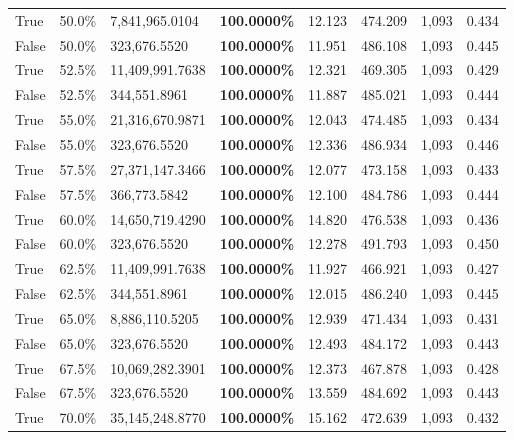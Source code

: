 \begin{table}[H]
\begin{tabular}{lllrllll}
\cline{1-8}
True & 50.0\% & 7,841,965.0104 & \bfseries \color{red} 100.0000\% & 12.123 & 474.209 & 1,093 & 0.434 \\
\cline{1-8}
False & 50.0\% & 323,676.5520 & \bfseries \color{red} 100.0000\% & 11.951 & 486.108 & 1,093 & 0.445 \\
\cline{1-8}
True & 52.5\% & 11,409,991.7638 & \bfseries \color{red} 100.0000\% & 12.321 & 469.305 & 1,093 & 0.429 \\
\cline{1-8}
False & 52.5\% & 344,551.8961 & \bfseries \color{red} 100.0000\% & 11.887 & 485.021 & 1,093 & 0.444 \\
\cline{1-8}
True & 55.0\% & 21,316,670.9871 & \bfseries \color{red} 100.0000\% & 12.043 & 474.485 & 1,093 & 0.434 \\
\cline{1-8}
False & 55.0\% & 323,676.5520 & \bfseries \color{red} 100.0000\% & 12.336 & 486.934 & 1,093 & 0.446 \\
\cline{1-8}
True & 57.5\% & 27,371,147.3466 & \bfseries \color{red} 100.0000\% & 12.077 & 473.158 & 1,093 & 0.433 \\
\cline{1-8}
False & 57.5\% & 366,773.5842 & \bfseries \color{red} 100.0000\% & 12.100 & 484.786 & 1,093 & 0.444 \\
\cline{1-8}
True & 60.0\% & 14,650,719.4290 & \bfseries \color{red} 100.0000\% & 14.820 & 476.538 & 1,093 & 0.436 \\
\cline{1-8}
False & 60.0\% & 323,676.5520 & \bfseries \color{red} 100.0000\% & 12.278 & 491.793 & 1,093 & 0.450 \\
\cline{1-8}
True & 62.5\% & 11,409,991.7638 & \bfseries \color{red} 100.0000\% & 11.927 & 466.921 & 1,093 & 0.427 \\
\cline{1-8}
False & 62.5\% & 344,551.8961 & \bfseries \color{red} 100.0000\% & 12.015 & 486.240 & 1,093 & 0.445 \\
\cline{1-8}
True & 65.0\% & 8,886,110.5205 & \bfseries \color{red} 100.0000\% & 12.939 & 471.434 & 1,093 & 0.431 \\
\cline{1-8}
False & 65.0\% & 323,676.5520 & \bfseries \color{red} 100.0000\% & 12.493 & 484.172 & 1,093 & 0.443 \\
\cline{1-8}
True & 67.5\% & 10,069,282.3901 & \bfseries \color{red} 100.0000\% & 12.373 & 467.878 & 1,093 & 0.428 \\
\cline{1-8}
False & 67.5\% & 323,676.5520 & \bfseries \color{red} 100.0000\% & 13.559 & 484.692 & 1,093 & 0.443 \\
\cline{1-8}
True & 70.0\% & 35,145,248.8770 & \bfseries \color{red} 100.0000\% & 15.162 & 472.639 & 1,093 & 0.432 \\

\end{tabular}
\end{table}
